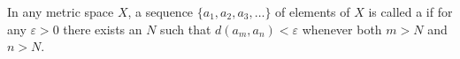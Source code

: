 In any metric space $X$, a sequence $\{a_1, a_2, a_3, \ldots\}$ of elements of $X$ is called a  if for any $\varepsilon > 0$ there exists an $N$ such that $d(a_m, a_n) < \varepsilon$ whenever both $m > N$ and $n > N$.
